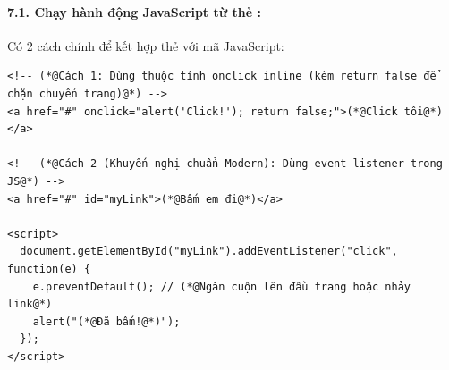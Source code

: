 \paragraph{7.1. Chạy hành động JavaScript từ thẻ :}
Có 2 cách chính để kết hợp thẻ  với mã JavaScript:

\begin{codeWindow}
\begin{lstlisting}[language=HTML5]
<!-- (*@Cách 1: Dùng thuộc tính onclick inline (kèm return false để chặn chuyển trang)@*) -->
<a href="#" onclick="alert('Click!'); return false;">(*@Click tôi@*)</a>

<!-- (*@Cách 2 (Khuyến nghị chuẩn Modern): Dùng event listener trong JS@*) -->
<a href="#" id="myLink">(*@Bấm em đi@*)</a>

<script>
  document.getElementById("myLink").addEventListener("click", function(e) {
    e.preventDefault(); // (*@Ngăn cuộn lên đầu trang hoặc nhảy link@*)
    alert("(*@Đã bấm!@*)");
  });
</script>
\end{lstlisting}
\end{codeWindow}

